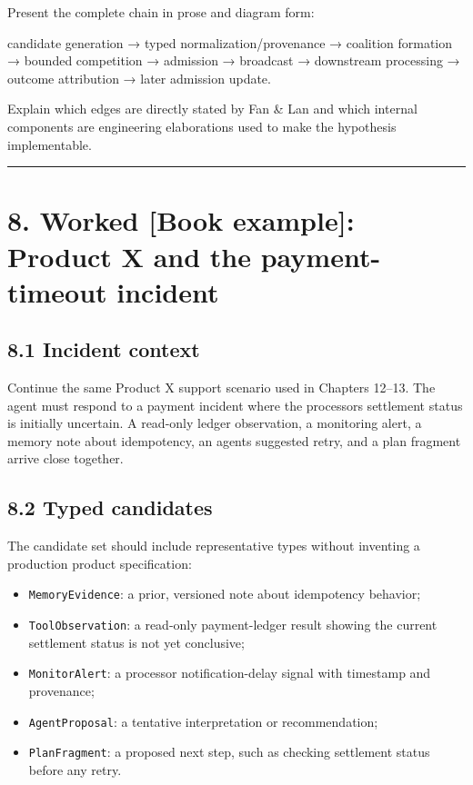 Present the complete chain in prose and diagram form:

candidate generation → typed normalization/provenance → coalition formation → bounded competition → admission → broadcast → downstream processing → outcome attribution → later admission update.

Explain which edges are directly stated by Fan \& Lan and which internal components are engineering elaborations used to make the hypothesis implementable.

\begin{center}\rule{0.5\linewidth}{0.5pt}\end{center}

\section{8. Worked {[}Book example{]}: Product X and the payment-timeout incident}\label{8-worked-book-example-product-x-and-the-payment-timeout-incident}

\subsection{8.1 Incident context}\label{81-incident-context}

Continue the same Product X support scenario used in Chapters 12--13. The agent must respond to a payment incident where the processor\textquotesingle s settlement status is initially uncertain. A read-only ledger observation, a monitoring alert, a memory note about idempotency, an agent\textquotesingle s suggested retry, and a plan fragment arrive close together.

\subsection{8.2 Typed candidates}\label{82-typed-candidates}

The candidate set should include representative types without inventing a production product specification:

\begin{itemize}
\tightlist
\item
  \texttt{MemoryEvidence}: a prior, versioned note about idempotency behavior;
\item
  \texttt{ToolObservation}: a read-only payment-ledger result showing the current settlement status is not yet conclusive;
\item
  \texttt{MonitorAlert}: a processor notification-delay signal with timestamp and provenance;
\item
  \texttt{AgentProposal}: a tentative interpretation or recommendation;
\item
  \texttt{PlanFragment}: a proposed next step, such as checking settlement status before any retry.
\end{itemize}

